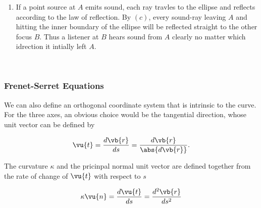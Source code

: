 \documentclass[english,a4paper,12pt]{report}
\begin{document}
{\begin{enumerate}
	with their gradients

	\begin{equation}
		\grad{AP} = \frac{(x+c)\vu{i} +y \vu{j} }{AP} ~\text { and }~ \grad{BP} = \frac{(x-c)\vu{i} +y \vu{j} }{BP}.    
	\end{equation}

	The equal angles can be shown by 

	\begin{equation}
		\grad{AP} \cdot \grad{\phi } = \grad{BP} \cdot \grad{\phi }.    
	\end{equation}
	
	Substituting and expanding we get 

	\begin{equation}
		a^2y^2 + a^2x^2 + a^2c^2- a^{4} - x^2c^2 = 0, 
	\end{equation}
	
	which is indeed true once we substitute \(c^2 = a^2-b^2\) and the ellipse equation \(x^2 /a^2 + y^2 /b^2 = 1\).  
	
	\item If a point source at \(A\) emits sound, each ray travles to the ellipse and reflects according to the law of reflection. By \((c)\), every sound-ray leaving \(A\) and hitting the inner boundary of the ellipse will be reflected straight to the other focus \(B\). Thus a listener at \(B\) hears sound from \(A\) clearly no matter which idrection it intially left \(A\).
	
\end{enumerate}
~
} 




\subsubsection{Frenet-Serret Equations}

We can also define an orthogonal coordinate system that is intrinsic to the curve. For the three axes, an obvious choice would be the tangential direction, whose unit vector can be defined by

\begin{equation}
	\vu{t} = \frac{d\vb{r} }{ds} = \frac{d \vb{r} }{\abs{d \vb{r} } }.
\end{equation}

The curvature \(\kappa \) and the pricinpal normal unit vector are defined together from the rate of change of \(\vu{t} \) with respect to \(s\)

\begin{equation}
	\kappa \vu{n}  = \frac{d \vu{t} }{ds} = \frac{d^2\vb{r} }{ds^2}
\end{equation}
\end{document}

